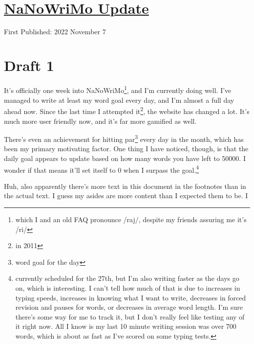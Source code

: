 \documentclass[12pt]{article}[titlepage]
\newcommand{\1}{\={a}}
\newcommand{\2}{\={e}}
\newcommand{\3}{\={\i}}
\newcommand{\4}{\=o}
\newcommand{\5}{\=u}
\newcommand{\6}{\={A}}
\renewcommand{\,}{\textsuperscript{,}}
\begin{document}

\doublespacing
\section{\href{nanowrimo-3.html}{NaNoWriMo Update}}
First Published: 2022 November 7
\section{Draft 1}
It's officially one week into NaNoWriMo\footnote{which I and an old FAQ pronounce /raj/, despite my friends assuring me it's /ri/}, and I'm currently doing well.
I've managed to write at least my word goal every day, and I'm almost a full day ahead now.
Since the last time I attempted it\footnote{in 2011}, the website has changed a lot.
It's much more user friendly now, and it's far more gamified as well.

There's even an achievement for hitting par\footnote{word goal for the day} every day in the month, which has been my primary motivating factor.
One thing I have noticed, though, is that the daily goal appears to update based on how many words you have left to 50000.
I wonder if that means it'll set itself to 0 when I surpass the goal.\footnote{currently scheduled for the 27th, but I'm also writing faster as the days go on, which is interesting.
I can't tell how much of that is due to increases in typing speeds, increases in knowing what I want to write, decreases in forced revision and pauses for words, or decreases in average word length. I'm sure there's some way for me to track it, but I don't really feel like testing any of it right now. All I know is my last 10 minute writing session was over 700 words, which is about as fast as I've scored on some typing tests.}

Huh, also apparently there's more text in this document in the footnotes than in the actual text.
I guess my asides are more content than I expected them to be.
I
\end{document}
